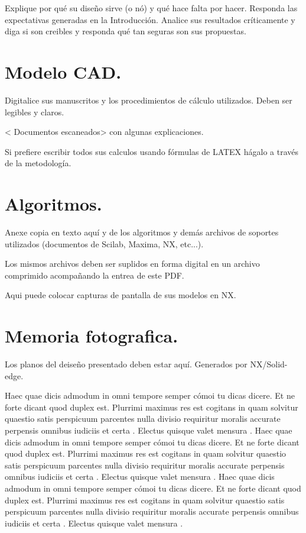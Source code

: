 \documentclass[10pt]{article}
\begin{document}
Explique por qué su diseño sirve (o nó) y qué hace falta por hacer.
Responda las expectativas generadas en la Introducción.
Analice sus resultados críticamente y diga si son creibles y responda
qué tan seguras son sus propuestas. 



 
 

\appendix  
\clearpage %
\addappheadtotoc 
\appendixpage 

\section{Modelo CAD.}

Digitalice sus manuscritos y los procedimientos de cálculo utilizados. Deben ser legibles y claros.

< Documentos escaneados> con algunas explicaciones.

Si prefiere escribir todos sus calculos usando fórmulas de LATEX hágalo a través de la metodología.

\section{Algoritmos.}

 Anexe copia en texto aquí y  de los algoritmos y demás archivos de soportes utilizados (documentos de Scilab, Maxima, NX, etc...).
 
 Los mismos archivos deben ser suplidos en forma digital en un archivo comprimido acompañando la entrea de este PDF.
 
 Aqui puede colocar capturas de pantalla de sus modelos en NX. 
 
 
 \section{Memoria fotografica.}
Los planos del deiseño presentado deben estar aquí. Generados por NX/Solid-edge.

Haec quae dicis admodum in omni tempore semper cómoi tu dicas dicere. Et ne forte dicant quod duplex est. Plurrimi maximus res est cogitans in quam solvitur quaestio satis perspicuum parcentes nulla divisio requiritur moralis accurate perpensis omnibus iudiciis et certa . Electus quisque valet mensura .
Haec quae dicis admodum in omni tempore semper cómoi tu dicas dicere. Et ne forte dicant quod duplex est. Plurrimi maximus res est cogitans in quam solvitur quaestio satis perspicuum parcentes nulla divisio requiritur moralis accurate perpensis omnibus iudiciis et certa . Electus quisque valet mensura .
Haec quae dicis admodum in omni tempore semper cómoi tu dicas dicere. Et ne forte dicant quod duplex est. Plurrimi maximus res est cogitans in quam solvitur quaestio satis perspicuum parcentes nulla divisio requiritur moralis accurate perpensis omnibus iudiciis et certa . Electus quisque valet mensura .
\end{document}
